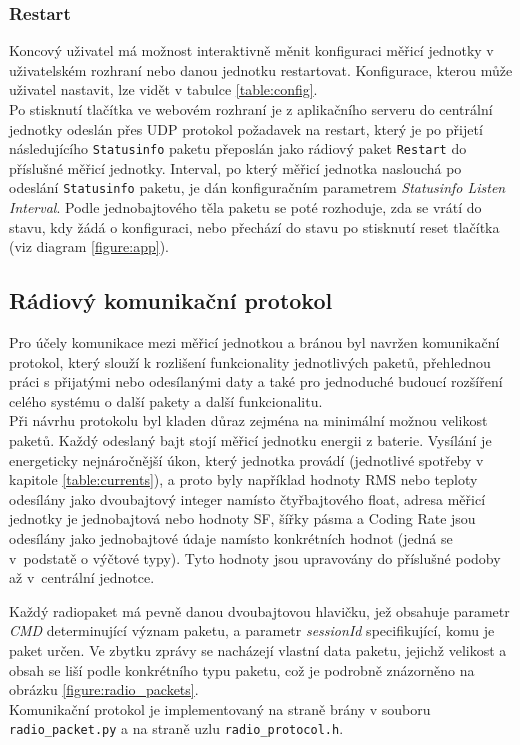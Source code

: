     \subsubsection{Restart}
    \label{section:restart}
    Koncový uživatel má možnost interaktivně měnit konfiguraci měřicí jednotky v uživatelském rozhraní nebo danou jednotku restartovat. Konfigurace, kterou může uživatel nastavit, lze vidět v tabulce \ref{table:config}.\\
    Po stisknutí tlačítka ve webovém rozhraní je z aplikačního serveru do centrální jednotky odeslán přes UDP protokol požadavek na restart, který je po přijetí následujícího \texttt{Statusinfo} paketu přeposlán jako rádiový paket \texttt{Restart} do příslušné měřicí jednotky. Interval, po který měřicí jednotka naslouchá po odeslání \texttt{Statusinfo} paketu, je dán konfiguračním parametrem \textit{Statusinfo Listen Interval}.
    Podle jednobajtového těla paketu se poté rozhoduje, zda se vrátí do stavu, kdy žádá o konfiguraci, nebo přechází do stavu po stisknutí reset tlačítka (viz diagram \ref{figure:app}).
  
    
    \subsection{Rádiový komunikační protokol}
    \label{section:protokol}
    Pro účely komunikace mezi měřicí jednotkou a bránou byl navržen komunikační protokol, který slouží k rozlišení funkcionality jednotlivých paketů, přehlednou práci s přijatými nebo odesílanými daty a také pro jednoduché budoucí rozšíření celého systému o další pakety a další funkcionalitu.\\
    Při návrhu protokolu byl kladen důraz zejména na minimální možnou velikost paketů. Každý odeslaný bajt stojí měřicí jednotku energii z baterie. Vysílání je energeticky nejnáročnější úkon, který jednotka provádí (jednotlivé spotřeby v kapitole \ref{table:currents}), a proto byly například hodnoty RMS nebo teploty odesílány jako dvoubajtový integer namísto čtyřbajtového float, adresa měřicí jednotky je jednobajtová nebo hodnoty SF, šířky pásma a Coding Rate jsou odesílány jako jednobajtové údaje namísto konkrétních hodnot (jedná se v~podstatě o výčtové typy). Tyto hodnoty jsou upravovány do příslušné podoby až v~centrální jednotce.
    
    Každý radiopaket má pevně danou dvoubajtovou hlavičku, jež obsahuje parametr \textit{CMD} determinující význam paketu, a parametr \textit{sessionId} specifikující, komu je paket určen.
    Ve zbytku zprávy se nacházejí vlastní data paketu, jejichž velikost a obsah se liší podle konkrétního typu paketu, což je podrobně znázorněno na obrázku \ref{figure:radio_packets}.\\
    Komunikační protokol je implementovaný na straně brány v souboru\\ \texttt{radio\_packet.py} a na straně uzlu \texttt{radio\_protocol.h}.
    
